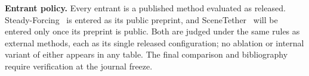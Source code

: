 \textbf{Entrant policy.} Every entrant is a published method evaluated as released. Steady-Forcing~\cite{minar2025steady} is entered as its public preprint, and SceneTether~\cite{scenetether2026} will be entered only once its preprint is public. Both are judged under the same rules as external methods, each as its single released configuration; no ablation or internal variant of either appears in any table. The final comparison and bibliography require verification at the journal freeze.

